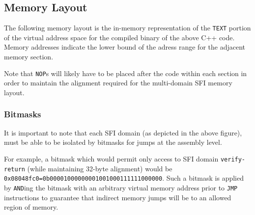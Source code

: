\documentclass[12pt]{article}
\begin{document}
\subsection{Memory Layout}

The following memory layout is the in-memory representation of the \verb|TEXT| portion of the virtual address space for the compiled binary of the above C++ code. Memory addresses indicate the lower bound of the adress range for the adjacent memory section.\\

\begin{drawstack}
	\startframe
		 
	\startframe
		 
	\startframe
		 
	\startframe
		 
	\startframe
		 
	\startframe
		 
	\startframe
		 
\end{drawstack}

Note that \texttt{NOP}s will likely have to be placed after the code within each section in order to maintain the alignment required for the multi-domain SFI memory layout.

\subsubsection{Bitmasks}

It is important to note that each SFI domain (as depicted in the above figure), must be able to be isolated by bitmasks for jumps at the assembly level. 

For example, a bitmask which would permit only access to SFI domain \texttt{verify-return} (while maintaining 32-byte alignment) would be \texttt{0x08048fc0=0b00001000000001001000111111000000}. Such a bitmask is applied by \texttt{AND}ing the bitmask with an arbitrary virtual memory address prior to \texttt{JMP} instructions to guarantee that indirect memory jumps will be to an allowed region of memory.
\end{document}
